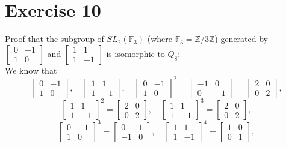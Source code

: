 \documentclass[12pt]{article}
\newcommand{\Z}{\mathbb{Z}}
\newcommand{\F}{\mathbb{F}}
\begin{document}
    \section*{Exercise 10}
    Proof that the subgroup of $SL_2(\F_3)$
    (where $\F_3 = \Z/3\Z$)
    generated by $\begin{bmatrix} 0 & -1 \\ 1 & 0 \end{bmatrix}$
    and $\begin{bmatrix} 1 & 1 \\ 1 & -1 \end{bmatrix}$
    is isomorphic to $Q_8$: \\
    We know that 
    \[ \begin{bmatrix} 0 & -1 \\ 1 & 0 \end{bmatrix}, \quad
        \begin{bmatrix} 1 & 1 \\ 1 & -1 \end{bmatrix}, \quad
        \begin{bmatrix} 0 & -1 \\ 1 & 0 \end{bmatrix}^2
        = \begin{bmatrix} -1 & 0 \\ 0 & -1 \end{bmatrix}
        = \begin{bmatrix} 2 & 0 \\ 0 & 2 \end{bmatrix}, \] 
    \[ \begin{bmatrix} 1 & 1 \\ 1 & -1 \end{bmatrix}^2
    = \begin{bmatrix} 2 & 0 \\ 0 & 2 \end{bmatrix}, \quad
    \begin{bmatrix} 1 & 1 \\ 1 & -1 \end{bmatrix}^3
    = \begin{bmatrix} 2 & 0 \\ 0 & 2 \end{bmatrix}, \]
    \[ \begin{bmatrix} 0 & -1 \\ 1 & 0 \end{bmatrix}^3
    = \begin{bmatrix} 0 & 1 \\ -1 & 0 \end{bmatrix}, \quad
    \begin{bmatrix} 1 & 1 \\ 1 & -1 \end{bmatrix}^4
    = \begin{bmatrix} 1 & 0 \\ 0 & 1 \end{bmatrix}, \] 
\end{document}
